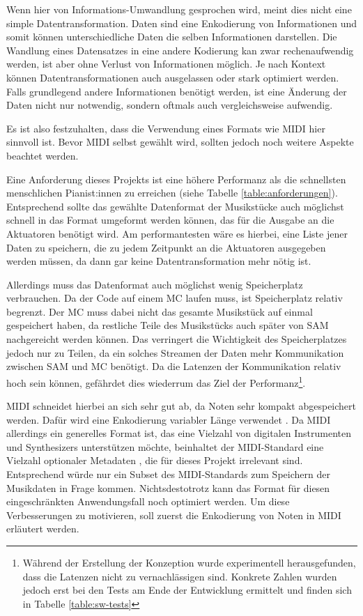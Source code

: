Wenn hier von Informations-Umwandlung gesprochen wird, meint dies nicht eine simple Datentransformation.
Daten sind eine Enkodierung von Informationen und somit können unterschiedliche Daten die selben Informationen darstellen.
Die Wandlung eines Datensatzes in eine andere Kodierung kan zwar rechenaufwendig werden, ist aber ohne Verlust von Informationen möglich.
Je nach Kontext können Datentransformationen auch ausgelassen oder stark optimiert werden.
Falls grundlegend andere Informationen benötigt werden, ist eine Änderung der Daten nicht nur notwendig, sondern oftmals auch vergleichsweise aufwendig.

Es ist also festzuhalten, dass die Verwendung eines Formats wie \ac{MIDI} hier sinnvoll ist.
Bevor \ac{MIDI} selbst gewählt wird, sollten jedoch noch weitere Aspekte beachtet werden.

Eine Anforderung dieses Projekts ist eine höhere Performanz als die schnellsten menschlichen Pianist:innen zu erreichen (siehe Tabelle \ref{table:anforderungen}).
Entsprechend sollte das gewählte Datenformat der Musikstücke auch möglichst schnell in das Format umgeformt werden können, das für die Ausgabe an die Aktuatoren benötigt wird.
Am performantesten wäre es hierbei, eine Liste jener Daten zu speichern, die zu jedem Zeitpunkt an die Aktuatoren ausgegeben werden müssen, da dann gar keine Datentransformation mehr nötig ist.

Allerdings muss das Datenformat auch möglichst wenig Speicherplatz verbrauchen.
Da der Code auf einem \ac{MC} laufen muss, ist Speicherplatz relativ begrenzt.
Der \ac{MC} muss dabei nicht das gesamte Musikstück auf einmal gespeichert haben, da restliche Teile des Musikstücks auch später von \ac{SAM} nachgereicht werden können.
Das verringert die Wichtigkeit des Speicherplatzes jedoch nur zu Teilen, da ein solches Streamen der Daten mehr Kommunikation zwischen \ac{SAM} und {MC} benötigt.
Da die Latenzen der Kommunikation relativ hoch sein können, gefährdet dies wiederrum das Ziel der Performanz\footnote{Während der Erstellung der Konzeption wurde experimentell herausgefunden, dass die Latenzen nicht zu vernachlässigen sind. Konkrete Zahlen wurden jedoch erst bei den Tests am Ende der Entwicklung ermittelt und finden sich in Tabelle \ref{table:sw-tests}}.

\ac{MIDI} schneidet hierbei an sich sehr gut ab, da Noten sehr kompakt abgespeichert werden.
Dafür wird eine Enkodierung variabler Länge verwendet \cite[vgl.][S. 131]{mid.CompleteMIDIDetailed.96}.
Da \ac{MIDI} allerdings ein generelles Format ist, das eine Vielzahl von digitalen Instrumenten und Synthesizers unterstützen möchte, beinhaltet der \ac{MIDI}-Standard eine Vielzahl optionaler Metadaten \cite[siehe][für die gesamte Liste]{vm.ControlChangeMessages.20}, die für dieses Projekt irrelevant sind.
Entsprechend würde nur ein Subset des \ac{MIDI}-Standards zum Speichern der Musikdaten in Frage kommen. \newline
Nichtsdestotrotz kann das Format für diesen eingeschränkten Anwendungsfall noch optimiert werden.
Um diese Verbesserungen zu motivieren, soll zuerst die Enkodierung von Noten in \ac{MIDI} erläutert werden.

